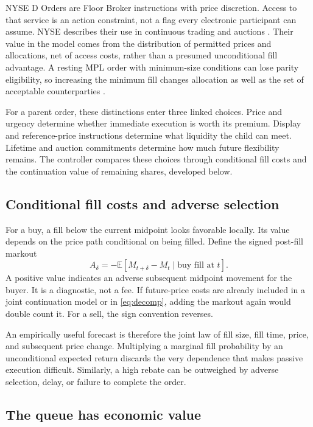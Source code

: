 \documentclass[11pt]{article}
\numberwithin{equation}{section}
\theoremstyle{definition}
\theoremstyle{remark}
\newcommand{\E}{\mathbb{E}}
\theoremstyle{definition}
\begin{document}
NYSE D Orders are Floor Broker instructions with price discretion. Access to
that service is an action constraint, not a flag every electronic participant
can assume. NYSE describes their use in continuous trading and auctions
\citep{nysedorders}. Their value in the model comes from the distribution of
permitted prices and allocations, net of access costs, rather than a presumed
unconditional fill advantage. A resting MPL order with minimum-size conditions
can lose parity eligibility, so increasing the minimum fill changes allocation
as well as the set of acceptable counterparties \citep{nysefunctional}.

For a parent order, these distinctions enter three linked choices. Price and
urgency determine whether immediate execution is worth its premium. Display
and reference-price instructions determine what liquidity the child can meet.
Lifetime and auction commitments determine how much future flexibility remains.
The controller compares these choices through conditional fill costs and the
continuation value of remaining shares, developed below.

\subsection{Conditional fill costs and adverse selection}

For a buy, a fill below the current midpoint looks favorable locally. Its value
depends on the price path conditional on being filled. Define the signed
post-fill markout
\begin{equation}
 A_\delta=-\E[M_{t+\delta}-M_t\mid \text{buy fill at }t].
\end{equation}
A positive value indicates an adverse subsequent midpoint movement for the
buyer. It is a diagnostic, not a fee. If future-price costs are already included
in a joint continuation model or in \eqref{eq:decomp}, adding the markout again
would double count it. For a sell, the sign convention reverses.

An empirically useful forecast is therefore the joint law of fill size, fill
time, price, and subsequent price change. Multiplying a marginal fill probability
by an unconditional expected return discards the very dependence that makes
passive execution difficult. Similarly, a high rebate can be outweighed by
adverse selection, delay, or failure to complete the order.

\subsection{The queue has economic value}
\end{document}
